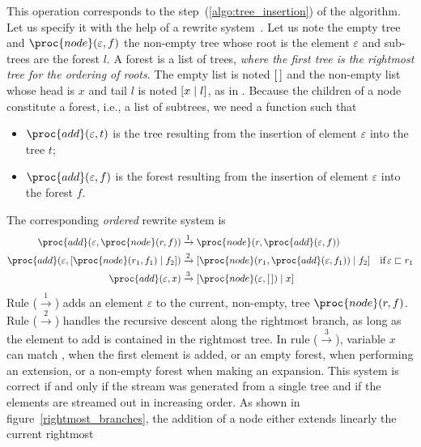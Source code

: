 This operation corresponds to the step~(\ref{algo:tree_insertion}) of
the algorithm. Let us specify it with the help of a rewrite
system~\cite{HTCS:1990}. Let us note  the empty \XML tree
and \(\proc{node}(\varepsilon, f)\) the non\hyp{}empty tree whose root
is the element \(\varepsilon\) and sub\hyp{}trees are the forest
\(l\). A forest is a list of trees, \emph{where the first tree is the
  rightmost tree for the ordering of roots}. The empty list is noted
\([\,]\) and the non-empty list whose head is \(x\) and tail \(l\) is
noted \([{x}\mid{l}]\), as in \Prolog. Because the children of a node
constitute a forest, i.e., a list of subtrees, we need a function
 such that
\begin{itemize}
 
  \item \(\proc{add}(\varepsilon, t)\) is the \XML tree resulting from
    the insertion of element \(\varepsilon\) into the \XML tree \(t\);

  \item \(\proc{add}(\varepsilon, f)\) is the \XML forest resulting
    from the insertion of element \(\varepsilon\) into the \XML forest
    \(f\).

\end{itemize}
The corresponding \emph{ordered} rewrite system is
\begin{align*}
  \proc{add}(\varepsilon, \proc{node}(r, f))
& \xrightarrow{1} \proc{node}(r, \proc{add}(\varepsilon, f))\\
  \proc{add}(\varepsilon, \cons{\proc{node}(r_1, f_1)}{f_2})
& \xrightarrow{2}
  \cons{\proc{node}(r_1, \proc{add}(\varepsilon, f_1))}{f_2}
& \text{if} \, \varepsilon \sqsubset r_1\\
  \proc{add}(\varepsilon, x)
& \xrightarrow{3}
  \cons{\proc{node}(\varepsilon, \el)}{x}
\end{align*}
Rule (\(\xrightarrow{1}\)) adds an element \(\varepsilon\) to the
current, non\hyp{}empty, \XML tree \(\proc{node}(r, f)\). Rule
(\(\xrightarrow{2}\)) handles the recursive descent along the
rightmost branch, as long as the element to add is contained in the
rightmost tree. In rule (\(\xrightarrow{3}\)), variable \(x\) can
match , when the first element is added, or an empty
forest, when performing an extension, or a non\hyp{}empty forest when
making an expansion. This system is correct if and only if the stream
was generated from a single \XML tree and if the elements are streamed
out in increasing order. As shown in figure~\ref{rightmost_branches},
the addition of a node either extends linearly the current rightmost
